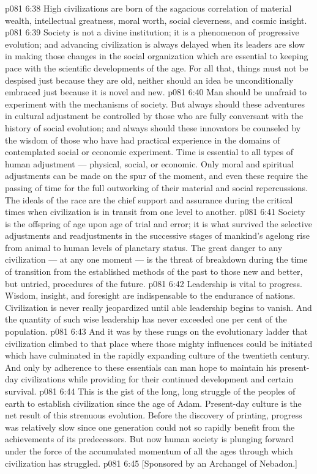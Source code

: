 \vs p081 6:38 High civilizations are born of the sagacious correlation of material wealth, intellectual greatness, moral worth, social cleverness, and cosmic insight.
\vs p081 6:39 \pc {}\bibnobreakspace {} Society is not a divine institution; it is a phenomenon of progressive evolution; and advancing civilization is always delayed when its leaders are slow in making those changes in the social organization which are essential to keeping pace with the scientific developments of the age. For all that, things must not be despised just because they are old, neither should an idea be unconditionally embraced just because it is novel and new.
\vs p081 6:40 Man should be unafraid to experiment with the mechanisms of society. But always should these adventures in cultural adjustment be controlled by those who are fully conversant with the history of social evolution; and always should these innovators be counseled by the wisdom of those who have had practical experience in the domains of contemplated social or economic experiment.  Time is essential to all types of human adjustment --- physical, social, or economic. Only moral and spiritual adjustments can be made on the spur of the moment, and even these require the passing of time for the full outworking of their material and social repercussions. The ideals of the race are the chief support and assurance during the critical times when civilization is in transit from one level to another.
\vs p081 6:41 \pc {}\bibnobreakspace {} Society is the offspring of age upon age of trial and error; it is what survived the selective adjustments and readjustments in the successive stages of mankind’s agelong rise from animal to human levels of planetary status. The great danger to any civilization --- at any one moment --- is the threat of breakdown during the time of transition from the established methods of the past to those new and better, but untried, procedures of the future.
\vs p081 6:42 Leadership is vital to progress. Wisdom, insight, and foresight are indispensable to the endurance of nations. Civilization is never really jeopardized until able leadership begins to vanish. And the quantity of such wise leadership has never exceeded one per cent of the population.
\vs p081 6:43 And it was by these rungs on the evolutionary ladder that civilization climbed to that place where those mighty influences could be initiated which have culminated in the rapidly expanding culture of the twentieth century. And only by adherence to these essentials can man hope to maintain his present\hyp{}day civilizations while providing for their continued development and certain survival.
\vs p081 6:44 \pc This is the gist of the long, long struggle of the peoples of earth to establish civilization since the age of Adam. Present\hyp{}day culture is the net result of this strenuous evolution. Before the discovery of printing, progress was relatively slow since one generation could not so rapidly benefit from the achievements of its predecessors. But now human society is plunging forward under the force of the accumulated momentum of all the ages through which civilization has struggled.
\vsetoff
\vs p081 6:45 [Sponsored by an Archangel of Nebadon.]
